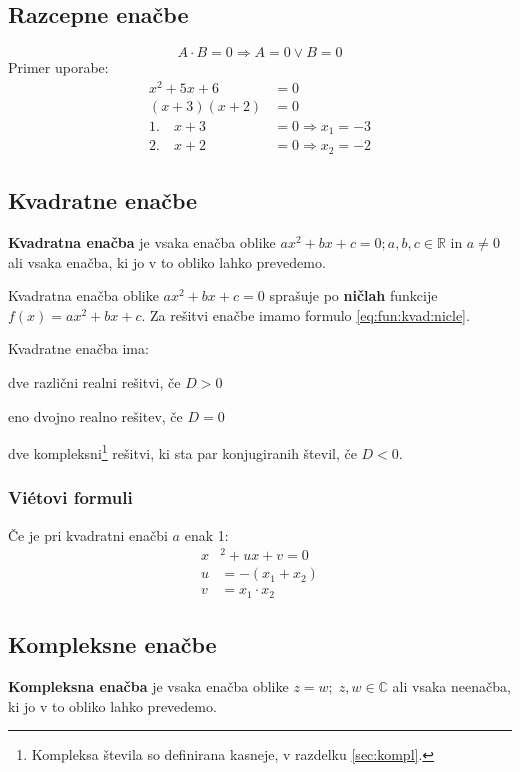\documentclass[a4paper,oneside,12pt,fleqn]{article}
\def\R{\ensuremath{\mathbb R}}
\def\C{\ensuremath{\mathbb C}}
\newcommand\krat\cdot
\renewcommand\implies\Rightarrow
\numberwithin{equation}{section}
\newenvironment{itemize*}%
{
\vspace{-12pt}%
\begin{itemize}%
\setlength{\itemsep}{0pt}%
\setlength{\parskip}{2pt}}%
{\end{itemize}}
\begin{document}
\subsection{Razcepne enačbe}
\label{sec:enac:razc}
\[ A \krat B = 0 \implies A = 0 \lor B = 0 \]
Primer uporabe:
\begin{align*}
  x^2 +5x + 6 &= 0 \\
  (x+3)(x+2) &= 0 \\
  1.\quad x + 3 &= 0 \implies x_1 = -3 \\
  2.\quad x + 2 &= 0 \implies x_2 = -2
\end{align*}

\subsection{Kvadratne enačbe}
\label{sec:enac:kvad}
\textbf{Kvadratna enačba} je vsaka enačba oblike $ax^2 + bx + c = 0; a, b, c \in \R$ in $a \neq 0$
ali vsaka enačba, ki jo v to obliko lahko prevedemo.

Kvadratna enačba oblike $ax^2 + bx + c = 0$ sprašuje po \textbf{ničlah} funkcije $f(x) = ax^2 + bx
+ c$. Za rešitvi enačbe imamo formulo \eqref{eq:fun:kvad:nicle}.

Kvadratne enačba ima:
\begin{itemize*}
  \item dve različni realni rešitvi, če $D > 0$
  \item eno dvojno realno rešitev, če $D = 0$
  \item dve kompleksni\footnote{Kompleksa števila so definirana kasneje, v razdelku
    \ref{sec:kompl}.\label{fn:komplnotyet}} rešitvi, ki sta par konjugiranih števil, če $D < 0$.
\end{itemize*}

\subsubsection{Vi\'{e}tovi formuli}
\label{sec:enac:kvad:viet}
Če je pri kvadratni enačbi $a$ enak 1:
\begin{align*}
  x&^2 + ux + v = 0 \\
  u& = -(x_1 + x_2) \\
  v& = x_1 \krat x_2
\end{align*}

\subsection{Kompleksne enačbe}
\label{sec:enac:kompl}
\textbf{Kompleksna enačba} je vsaka enačba oblike $z = w;\; z, w \in \C$ ali vsaka neenačba, ki jo v
to obliko lahko prevedemo.
\end{document}
